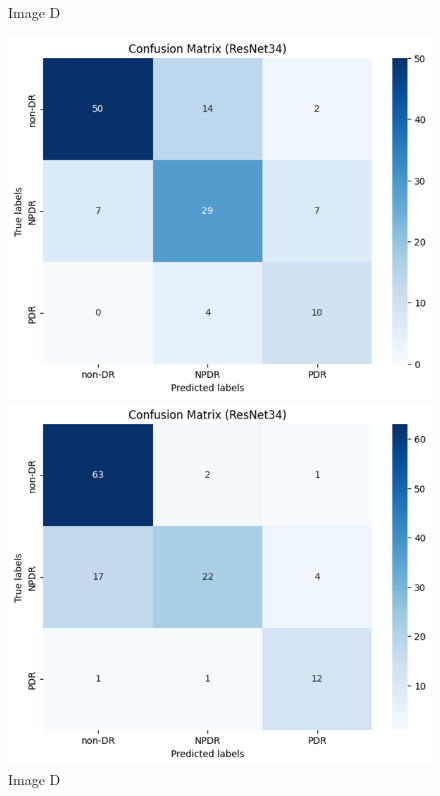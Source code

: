 \begin{figure}[H]
\begin{minipage}[t]{0.475\textwidth}
            \caption{Image D}
            \label{fig:2b}
        \end{minipage}
        \begin{minipage}[t]{0.475\textwidth} %
            \includegraphics[draft=false, width=\textwidth]{gambar/confusionMatrixResnet34class-weighted_bestTrain.png} 
            \caption{Image D}
            \label{fig:2b}
        \end{minipage}
        \begin{minipage}[t]{0.475\textwidth} %
            \includegraphics[draft=false, width=\textwidth]{gambar/confusionMatrixResnet34class-weighted_bestVal.png} 

\end{minipage}
\end{figure}
